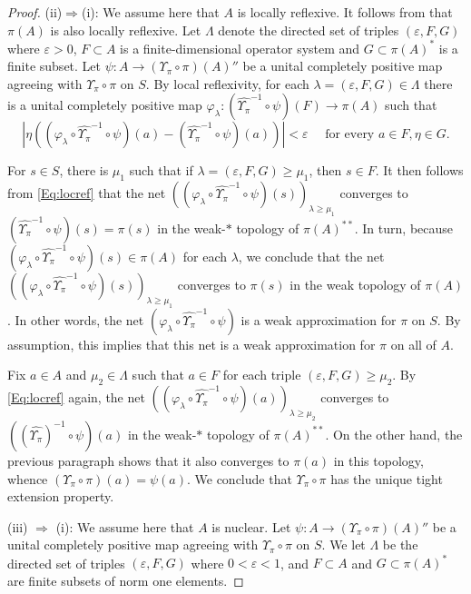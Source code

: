 \documentclass[10pt]{amsart}
\newcommand{\eps}{\varepsilon}
\renewcommand{\phi}{\varphi}
\theoremstyle{definition}
\begin{document}
\begin{proof}
(ii)$\Rightarrow$(i): We assume here that $A$ is locally reflexive. It follows from \cite[Proposition 5.3]{effros1985lifting} that $\pi(A)$ is also locally reflexive. Let $\Lambda$ denote the directed set of triples $(\eps,F,G)$ where $\eps>0$, $F\subset A$ is a finite-dimensional operator system and $G\subset \pi(A)^*$ is a finite subset. Let $\psi:A\to (\Upsilon_\pi\circ \pi)(A)''$ be a unital completely positive map agreeing with $\Upsilon_\pi\circ \pi$ on $S$. By local reflexivity, for each $\lambda=(\eps ,F,G) \in\Lambda$ there is a unital completely positive map $\phi_\lambda:(\widehat{\Upsilon_\pi}^{-1}\circ \psi)(F)  \to \pi(A)$ such that 
\begin{equation}\label{Eq:locref}
|\eta ( (\phi_\lambda\circ \widehat{\Upsilon_\pi}^{-1}\circ \psi)(a)-(\widehat{\Upsilon_\pi}^{-1}\circ \psi)(a))|<\eps  \quad  \text{ for every } a\in F, \eta\in G.
\end{equation}

For $s\in S$, there is $\mu_1$ such that if $\lambda=(\eps,F,G)\geq \mu_1$, then $s\in F$. It then follows from \eqref{Eq:locref}  that the net $( (\phi_\lambda\circ \widehat{\Upsilon_\pi}^{-1}\circ \psi)(s))_{\lambda\geq \mu_1}$ converges to $(\widehat{\Upsilon_\pi}^{-1}\circ \psi)(s)=\pi(s)$ in the weak-$*$ topology of $\pi(A)^{**}$. In turn, because $ (\phi_\lambda\circ \widehat{\Upsilon_\pi}^{-1}\circ \psi)(s)\in \pi(A)$ for each $\lambda$, we conclude that the net $( (\phi_\lambda\circ \widehat{\Upsilon_\pi}^{-1}\circ \psi)(s))_{\lambda\geq \mu_1}$  converges to $\pi(s)$ in the weak topology of $\pi(A)$. In other words, the net $ (\phi_\lambda\circ \widehat{\Upsilon_\pi}^{-1}\circ \psi) $ is a weak approximation for $\pi$ on $S$. By assumption, this implies that this net is a weak approximation for $\pi$ on all of $A$. 

Fix $a\in A$ and $\mu_2\in\Lambda$ such that $a\in F$ for each triple $(\eps,F,G)\geq \mu_2$. By \eqref{Eq:locref} again,  the net $( (\phi_\lambda\circ \widehat{\Upsilon_\pi}^{-1}\circ \psi)(a))_{\lambda\geq \mu_2}$ converges to $((\widehat{\Upsilon_\pi})^{-1}\circ \psi)(a)$ in the weak-$*$ topology of $\pi(A)^{**}$. On the other hand, the previous paragraph shows that it also converges to $\pi(a)$ in this topology, whence $(\Upsilon_\pi\circ \pi)(a)=\psi(a)$. We conclude that $\Upsilon_\pi\circ \pi$ has the unique tight extension property.

(iii) $\Rightarrow$ (i): We assume here that $A$ is nuclear. Let $\psi:A\to (\Upsilon_\pi\circ \pi)( A)''$ be a unital completely positive map agreeing with $\Upsilon_\pi\circ \pi$ on $S$. We let $\Lambda$ be the directed set of triples $(\eps,F,G)$ where $0<\eps<1$, and $F\subset A$ and $G\subset \pi(A)^*$ are finite subsets of norm one elements. 


\end{proof}
\end{document}
